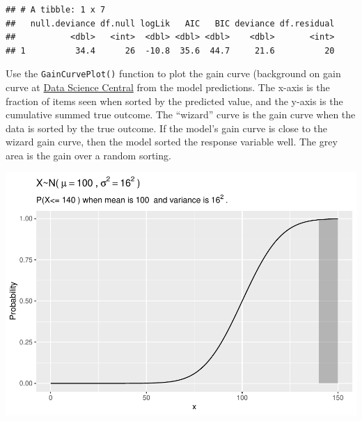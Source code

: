\documentclass[
]{book}
\newenvironment{Shaded}{\begin{snugshade}}{\end{snugshade}}
\newcommand{\DataTypeTok}[1]{\textcolor[rgb]{0.13,0.29,0.53}{#1}}
\newcommand{\KeywordTok}[1]{\textcolor[rgb]{0.13,0.29,0.53}{\textbf{#1}}}
\newcommand{\NormalTok}[1]{#1}
\newcommand{\OperatorTok}[1]{\textcolor[rgb]{0.81,0.36,0.00}{\textbf{#1}}}
\newcommand{\StringTok}[1]{\textcolor[rgb]{0.31,0.60,0.02}{#1}}
\begin{document}
\begin{verbatim}
## # A tibble: 1 x 7
##   null.deviance df.null logLik   AIC   BIC deviance df.residual
##           <dbl>   <int>  <dbl> <dbl> <dbl>    <dbl>       <int>
## 1          34.4      26  -10.8  35.6  44.7     21.6          20
\end{verbatim}

Use the \texttt{GainCurvePlot()} function to plot the gain curve (background on gain curve at \href{https://www.datasciencecentral.com/profiles/blogs/understanding-and-interpreting-gain-and-lift-charts}{Data Science Central} from the model predictions. The x-axis is the fraction of items seen when sorted by the predicted value, and the y-axis is the cumulative summed true outcome. The ``wizard'' curve is the gain curve when the data is sorted by the true outcome. If the model's gain curve is close to the wizard gain curve, then the model sorted the response variable well. The grey area is the gain over a random sorting.

\begin{Shaded}
\end{Shaded}

\includegraphics{data-sci_files/figure-latex/unnamed-chunk-14-1.pdf}
\end{document}
